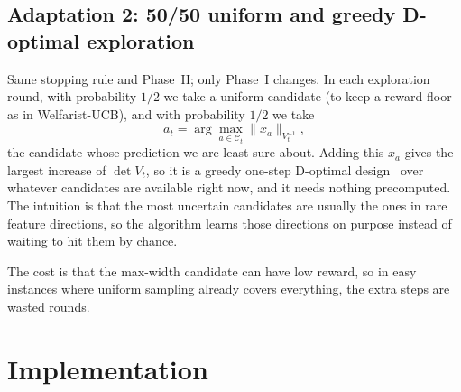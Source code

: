 \documentclass[11pt,a4paper]{article}
\begin{document}
\subsection{Adaptation 2: 50/50 uniform and greedy D-optimal exploration}
Same stopping rule and Phase~II; only Phase~I changes. In each exploration round, with probability $1/2$ we take a uniform candidate (to keep a reward floor as in Welfarist-UCB), and with probability $1/2$ we take
\[
a_t=\arg\max_{a\in\mathcal{C}_t}\|x_a\|_{V_t^{-1}},
\]
the candidate whose prediction we are least sure about. Adding this $x_a$ gives the largest increase of $\det V_t$, so it is a greedy one-step D-optimal design~\cite{lattimore2020} over whatever candidates are available right now, and it needs nothing precomputed. The intuition is that the most uncertain candidates are usually the ones in rare feature directions, so the algorithm learns those directions on purpose instead of waiting to hit them by chance.

The cost is that the max-width candidate can have low reward, so in easy instances where uniform sampling already covers everything, the extra steps are wasted rounds.

\section{Implementation}
\end{document}
